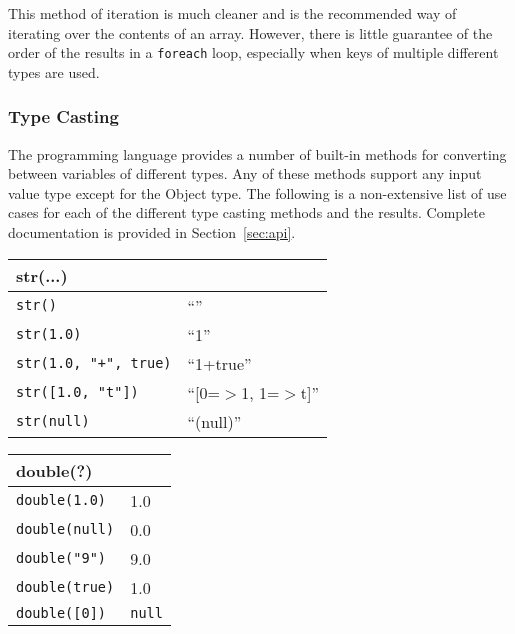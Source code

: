 This method of iteration is much cleaner and is the recommended way of
iterating over the contents of an array. However, there is little guarantee
of the order of the results in a {\tt foreach} loop, especially when keys
of multiple different types are used.

\subsubsection{Type Casting}

The \ModLang programming language provides a number of built-in methods for
converting between variables of different types. Any of these methods support
any input value type except for the Object type. The following is a non-extensive
list of use cases for each of the different type casting methods and the
results. Complete documentation is provided in Section~\ref{sec:api}.

\begin{multicols}{2}
  \begin{center}
    \begin{tabular}{|p{1.7in}|p{1.0in}|}
      \hline
      \multicolumn{2}{|l|}{\textbf{str(...)}}\\
      \hline
      {\tt str()} & ``'' \\
      {\tt str(1.0)} & ``1'' \\
      {\tt str(1.0, "+", true)} & ``1+true'' \\
      {\tt str([1.0, "t"])} & ``[0=$>$1, 1=$>$t]''\\
      {\tt str(null)} & ``(null)''\\
      \hline
    \end{tabular}
  \end{center}
  \begin{center}
    \begin{tabular}{|p{1.7in}|p{1.0in}|}
      \hline
      \multicolumn{2}{|l|}{\textbf{double(?)}}\\
      \hline
      {\tt double(1.0)} & 1.0\\
      {\tt double(null)}& 0.0\\
      {\tt double("9")} & 9.0\\
      {\tt double(true)}& 1.0\\
      {\tt double([0])} & {\tt null}\\
      \hline
    \end{tabular}
  \end{center}
\end{multicols}

